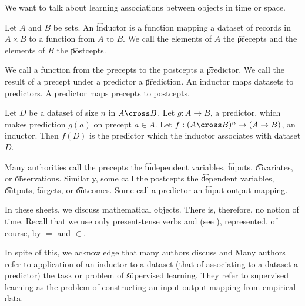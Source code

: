 

We want to talk about learning
associations between objects
in time or space.


Let $A$ and $B$ be sets.
An \t{inductor} is a function mapping a dataset of records in $A \times B$ to a function from $A$ to $B$.
We call the elements of $A$ the \t{precepts} and the elements of $B$ the \t{postcepts}.

We call a function from the precepts to the postcepts a \t{predictor}.
We call the result of a precept under a predictor a \t{prediction}.
An inductor maps datasets to predictors.
A predictor maps precepts to postcepts.


Let $D$ be a dataset of size $n$ in $A \cross B$.
Let $g: A \to B$, a predictor, which makes prediction $g(a)$ on precept $a \in A$.
Let $f: (A \cross B)^n \to (A \to B)$, an inductor.
Then $f(D)$ is the predictor which the inductor associates with dataset $D$.


Many authorities call the precepts the \t{independent variables}, \t{inputs}, \t{covariates}, or \t{observations}.
Similarly, some call the postcepts the \t{dependent variables}, \t{outputs}, \t{targets}, or \t{outcomes}.
Some call a predictor an \t{input-output} mapping.


In these sheets, we discuss mathematical objects.
There is, therefore, no notion of time.
Recall that we use only present-tense verbs  and  (see ), represented, of course, by $=$ and $\in$.

In spite of this, we acknowledge that many authors discuss   and 
Many authors refer to application of an inductor to a dataset (that of associating to a dataset a predictor) the task or problem of \t{supervised learning}.
They refer to supervised learning as the problem of constructing an input-output mapping from empirical data.

\blankpage
